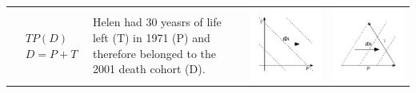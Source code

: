 \documentclass[12pt,oneside,letter]{article} %
\begin{document}
\begin{center}
\begin{longtable}{m{}m{}m{}m{}}
  \midrule
  $$\begin{aligned}
    &TP(D) \\
    &D = P + T
  \end{aligned}$$ & Helen had 30 yeasrs of life left (T) in 1971 (P) and
  therefore belonged to the 2001 death cohort (D). & \includegraphics[width =
  \linewidth]{Figures/JonasTable/TPd.pdf} & \includegraphics[width = \linewidth]{Figures/JonasTable/TPd_iso.pdf}  \\

\end{longtable}
\end{center}
\end{document}
